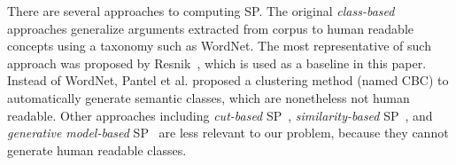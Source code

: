 There are several approaches to computing SP.
The original {\em class-based} approaches
generalize arguments extracted from corpus to human readable
concepts using a taxonomy such as WordNet.
The most representative of such approach was proposed
by Resnik~,
which is used as a baseline in this paper.
Instead of WordNet,
Pantel et al.
proposed a clustering method (named CBC) to
automatically generate semantic classes, which are nonetheless
not human readable.
Other approaches including {\em cut-based} SP~\cite{li1998generalizing},
{\em similarity-based} SP~\cite{clark2001class,erk2007simple},
and {\em generative model-based} SP~\cite{Ritter:2010}
are less relevant to our problem,
because they cannot generate human readable classes.


